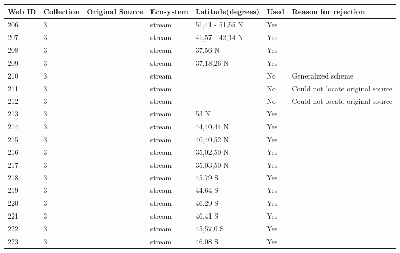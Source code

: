 \documentclass[12pt]{article}
\begin{document}
\begin{landscape}
    \begin{table}[h!]
    \centering
    {\footnotesize
      \begin{tabular}{p{2.8cm}p{1.3cm}p{5.5cm}p{2.2cm}p{2.5cm}lp{3.5cm}}
        \hline
        Web ID & Collection & Original Source & Ecosystem & Latitude(degrees) & Used  & Reason for rejection  \\
        \hline
        206   & 3 & \citet{Jones1949}     & stream & 51,41 - 51,55 N & Yes   &       \\
        207   & 3 & \citet{Koslucher1973}    & stream & 41,57 - 42,14 N & Yes   &       \\
        208   & 3 & \citet{Minckley1963}    & stream & 37,56 N & Yes   &       \\
        209   & 3 & \citet{Minshall1967}    & stream & 37,18,26 N & Yes   &       \\
        210   & 3 & \citet{Percival1929}     & stream &       & No    & Generalized scheme \\
        211   & 3 & \citet{Ricker1935}  & stream &       & No    & Could not locate original source \\
        212   & 3 & \citet{Ricker1935}  & stream &       & No    & Could not locate original source \\
        213   & 3 & \citet{Badcock1949}     & stream & 53 N  & Yes   &       \\
        214   & 3 & \citet{Thompson2003}    & stream & 44,40,44 N & Yes   &       \\
        215   & 3 & \citet{Thompson2003}    & stream & 40,40,52 N & Yes   &       \\
        216   & 3 & \citet{Thompson2003}    & stream & 35,02,50 N & Yes   &       \\
        217   & 3 & \citet{Thompson2003}    & stream & 35,03,50 N & Yes   &       \\
        218   & 3 & \citet{Thompson2004c}  & stream & 45.79 S & Yes   &       \\
        219   & 3 & \citet{Thompson2004c}  & stream & 44.64 S & Yes   &       \\
        220   & 3 & \citet{Thompson2004c}  & stream & 46.29 S & Yes   &       \\
        221   & 3 & \citet{Thompson2004c}  & stream & 46.41 S & Yes   &       \\
        222   & 3 & \citet{Thompson2004c}  & stream & 45,57,0 S & Yes   &       \\
        223   & 3 & \citet{Thompson2004c}  & stream & 46.08 S & Yes   &       \\

\end{tabular}}
\end{table}
\end{landscape}
\end{document}
